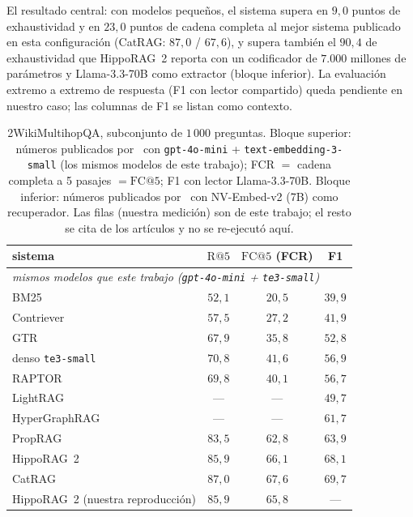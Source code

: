 \documentclass[11pt,a4paper]{article}
\newcommand{\hippo}{HippoRAG~2}
\begin{document}
El resultado central: con modelos pequeños, el sistema supera en $9{,}0$
puntos de exhaustividad y en $23{,}0$ puntos de cadena completa al mejor
sistema publicado en esta configuración (CatRAG: $87{,}0$ / $67{,}6$), y
supera también el $90{,}4$ de exhaustividad que \hippo{} reporta con un
codificador de $7.000$ millones de parámetros y Llama-3.3-70B como
extractor (bloque inferior). La evaluación extremo a extremo de respuesta
(F1 con lector compartido) queda pendiente en nuestro caso; las columnas de
F1 se listan como contexto.

\begin{table}[t]
\centering\footnotesize\setlength{\tabcolsep}{4pt}
\caption{2WikiMultihopQA, subconjunto de $1\,000$ preguntas. Bloque
superior: números publicados por~\cite{catrag} con \texttt{gpt-4o-mini} +
\texttt{text-embedding-3-small} (los mismos modelos de este trabajo); FCR
$=$ cadena completa a 5 pasajes $= \mathrm{FC@}5$; F1 con lector
Llama-3.3-70B. Bloque inferior: números publicados por~\cite{hipporag2} con
NV-Embed-v2 (7B) como recuperador. Las filas \guillemotleft{}(nuestra medición)\guillemotright{} son
de este trabajo; el resto se cita de los artículos y no se re-ejecutó aquí.}
\label{tab:sota}
\begin{tabular}{lccc}
\toprule
sistema & $\mathrm{R@}5$ & $\mathrm{FC@}5$ (FCR) & F1\\
\midrule
\multicolumn{4}{l}{\emph{mismos modelos que este trabajo
(\texttt{gpt-4o-mini} + \texttt{te3-small})~\cite{catrag}}}\\
BM25~\cite{catrag} & $52{,}1$ & $20{,}5$ & $39{,}9$\\
Contriever~\cite{contriever} & $57{,}5$ & $27{,}2$ & $41{,}9$\\
GTR~\cite{gtr} & $67{,}9$ & $35{,}8$ & $52{,}8$\\
denso \texttt{te3-small} & $70{,}8$ & $41{,}6$ & $56{,}9$\\
RAPTOR~\cite{raptor} & $69{,}8$ & $40{,}1$ & $56{,}7$\\
LightRAG~\cite{lightrag} & --- & --- & $49{,}7$\\
HyperGraphRAG~\cite{hypergraphrag} & --- & --- & $61{,}7$\\
PropRAG~\cite{proprag} & $83{,}5$ & $62{,}8$ & $63{,}9$\\
\hippo{}~\cite{hipporag2} & $85{,}9$ & $66{,}1$ & $68{,}1$\\
CatRAG~\cite{catrag} & $87{,}0$ & $67{,}6$ & $69{,}7$\\
\hippo{} (nuestra reproducción) & $85{,}9$ & $65{,}8$ & ---\\

\end{tabular}
\end{table}
\end{document}
